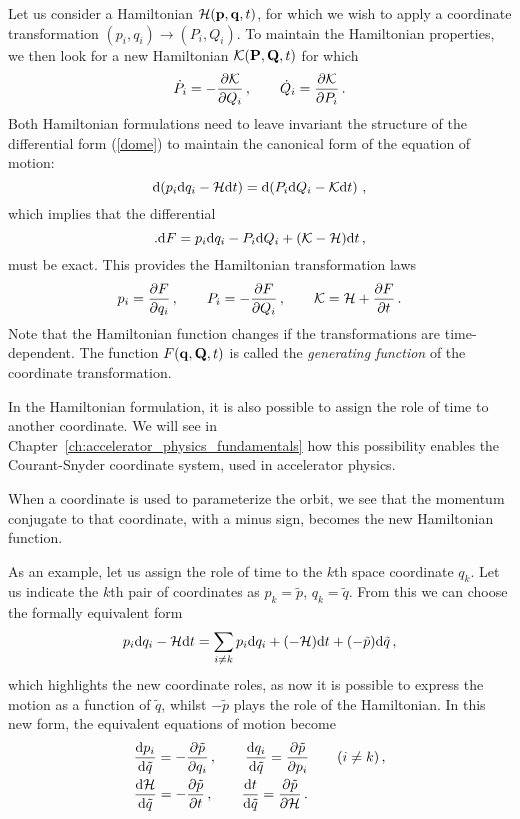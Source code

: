Let us consider a Hamiltonian $\mathcal{H}(\vb{p},\vb{q},t)$, for which we wish to apply a coordinate transformation $(p_i,q_i)\to(P_i,Q_i)$. To maintain the Hamiltonian properties, we then look for a new Hamiltonian $\mathcal{K}(\vb{P},\vb{Q},t)$ for which
%
\begin{equation}
    \dot P_i = -\pdv{\mathcal{K}}{Q_i}\,, \qquad \dot Q_i = \pdv{\mathcal{K}}{P_i}\,.
\end{equation}
%
Both Hamiltonian formulations need to leave invariant the structure of the differential form (\ref{dome}) to maintain the canonical form of the equation of motion:
%
\begin{equation}
    \dd (p_i \dd q_i- \mathcal{H} \dd t) = \dd(P_i \dd Q_i - \mathcal{K}\dd t)\,,
\end{equation}
%
which implies that the differential
%
\begin{equation}.
    \dd F = p_i\dd q_i - P_i \dd Q_i + (\mathcal{K}-\mathcal{H})\dd t\, ,
\end{equation}
%
must be exact. This provides the Hamiltonian transformation laws
%
\begin{equation} 
	p_i = \pdv{F}{q_i}\,, \qquad P_i = -\pdv{F}{Q_i}\,, \qquad \mathcal{K}=\mathcal{H}+\pdv{F}{t}\,.
\end{equation}
%
Note that the Hamiltonian function changes if the transformations are time-dependent. The function $F(\vb{q},\vb{Q},t)$ is called the \textit{generating function} of the coordinate transformation.

In the Hamiltonian formulation, it is also possible to assign the role of time to another coordinate. We will see in Chapter~\ref{ch:accelerator_physics_fundamentals} how this possibility enables the Courant-Snyder coordinate system, used in accelerator physics.

When a coordinate is used to parameterize the orbit, we see that the momentum conjugate to that coordinate, with a minus sign, becomes the new Hamiltonian function.

As an example, let us assign the role of time to the $k$th space coordinate $q_k$. Let us indicate the $k$th pair of coordinates as $p_k = \tilde p$, $q_k=\tilde q$. From this we can choose the formally equivalent form
%
\begin{equation}
    p_i \dd q_i - \mathcal{H} \dd t = \sum_{i\neq k} p_i \dd q_i + (-\mathcal{H})\dd t + (-\tilde p)\dd\tilde q\,,
\end{equation}
%
which highlights the new coordinate roles, as now it is possible to express the motion as a function of $\tilde q$, whilst $-\tilde p$ plays the role of the Hamiltonian. In this new form, the equivalent equations of motion become
%
\begin{equation} 
\begin{split}
	&\dv{p_i}{\tilde q} = -\pdv{\tilde p}{q_i}\,, \qquad \dv{q_i}{\tilde q} = \pdv{\tilde p}{p_i} \qquad (i\neq k)\,, \\
	&\dv{\mathcal{H}}{\tilde q} = -\pdv{\tilde p}{t}\,,  \qquad \dv{t}{\tilde q} = \pdv{\tilde p}{\mathcal{H}}\,. 
\end{split}
\end{equation}

